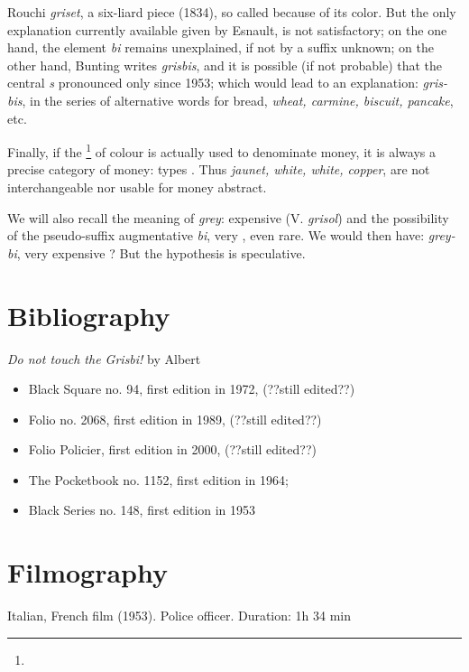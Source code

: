 Rouchi \emph{griset}, \og a six-liard piece \fg{} (1834), so called because of its color. But the only explanation currently available given by Esnault,  is not satisfactory; on the one hand, the element \emph{bi} remains
unexplained, if not by a \og suffix \fg{} unknown; on the other hand, Bunting writes
\emph{grisbis}, and it is possible (if not probable) that the central \emph{s}
pronounced only since 1953; which would lead to an explanation:
\emph{gris-bis}, in the series of alternative words for bread,
\emph{wheat, carmine, biscuit, pancake}, etc.

Finally, if the \footnote{\urlMetonym{}} of colour is actually used to denominate
money, it is always a precise category of money: \og types \fg{}.
Thus \emph{jaunet, white, white, copper}, are not interchangeable nor
usable for \og money \fg{} abstract.

We will also recall the meaning of \emph{grey}: \og expensive \fg{} (V. \emph{grisol}) and the possibility of the pseudo-suffix augmentative \emph{bi}, \og very \fg{} , even rare. We would then have: \emph{grey-bi}, \og very expensive \fg{}? But the hypothesis is speculative.

\section*{Bibliography}

\emph{Do not touch the Grisbi!} by Albert 

\begin{itemize}
\item Black Square no. 94, first edition in 1972, (??still edited??)
\item Folio no. 2068, first edition in 1989, (??still edited??)
\item Folio Policier, first edition in 2000, (??still edited??)
\item The Pocketbook no. 1152, first edition in 1964;
\item Black Series no. 148, first edition in 1953

\end{itemize}

\section*{Filmography}


Italian, French film (1953). Police officer. Duration: 1h 34 min


